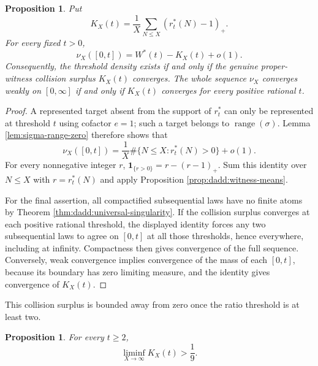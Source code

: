 \documentclass[11pt,letterpaper,reqno]{amsart}
\numberwithin{equation}{section}
\newtheorem{proposition}[theorem]{Proposition}
\theoremstyle{remark}
\newcommand{\1}{\mathbf 1}
\renewcommand{\leq}{\leqslant}
\renewcommand{\geq}{\geqslant}
\begin{document}
\begin{proposition}
\label{prop:dadd:collision-criterion}
Put
\[
 K_X(t)=\frac1X\sum_{N\leq X}(r_t^*(N)-1)_+.
\]
For every fixed $t>0$,
\begin{equation}
\label{eq:dadd:collision-criterion}
 \nu_X([0,t])=W^*(t)-K_X(t)+o(1).
\end{equation}
Consequently, the threshold density exists if and only if the
genuine proper-witness collision surplus $K_X(t)$ converges.
The whole sequence $\nu_X$ converges weakly on $[0,\infty]$ if and only
if $K_X(t)$ converges for every positive rational $t$.
\end{proposition}

\begin{proof}
A represented target absent from the support of $r_t^*$ can only
be represented at threshold $t$ using cofactor $e=1$; such a
target belongs to $\operatorname{range}(\sigma)$. Lemma
\ref{lem:sigma-range-zero} therefore shows that
\[
 \nu_X([0,t])
 =\frac1X\#\{N\leq X:r_t^*(N)>0\}+o(1).
\]
For every nonnegative integer $r$,
$\boldsymbol1_{\{r>0\}}=r-(r-1)_+$. Sum this identity over
$N\leq X$ with $r=r_t^*(N)$ and apply
Proposition \ref{prop:dadd:witness-means}.

For the final assertion, all compactified subsequential laws have no
finite atoms by Theorem \ref{thm:dadd:universal-singularity}. If the
collision surplus converges at each positive rational threshold, the
displayed identity forces any two subsequential laws to agree on
$[0,t]$ at all those thresholds, hence everywhere, including at infinity.
Compactness then gives convergence of the full sequence. Conversely,
weak convergence implies convergence of the mass of each $[0,t]$,
because its boundary has zero limiting measure, and the identity gives
convergence of $K_X(t)$.
\end{proof}

This collision surplus is bounded away from zero once the ratio threshold is at least two.

\begin{proposition}
For every $t\geq2$,
\[
 \liminf_{X\to\infty}K_X(t)>\frac19.
\]
\end{proposition}
\end{document}
